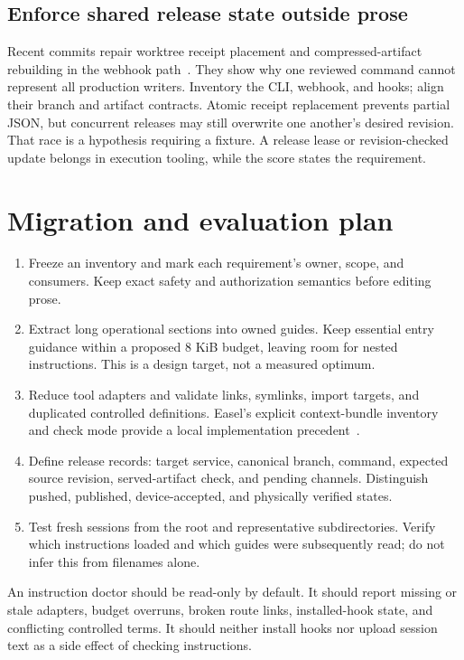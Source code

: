 \documentclass[10pt,letterpaper,twocolumn]{article}
\begin{document}
\subsection{Enforce shared release state outside prose}
Recent commits repair worktree receipt placement and compressed-artifact rebuilding in the webhook path~\cite{releasefixes}. They show why one reviewed command cannot represent all production writers. Inventory the CLI, webhook, and hooks; align their branch and artifact contracts. Atomic receipt replacement prevents partial JSON, but concurrent releases may still overwrite one another's desired revision. That race is a hypothesis requiring a fixture. A release lease or revision-checked update belongs in execution tooling, while the score states the requirement.

\section{Migration and evaluation plan}
\begin{enumerate}
\item Freeze an inventory and mark each requirement's owner, scope, and consumers. Keep exact safety and authorization semantics before editing prose.
\item Extract long operational sections into owned guides. Keep essential entry guidance within a proposed 8 KiB budget, leaving room for nested instructions. This is a design target, not a measured optimum.
\item Reduce tool adapters and validate links, symlinks, import targets, and duplicated controlled definitions. Easel's explicit context-bundle inventory and check mode provide a local implementation precedent~\cite{bundle}.
\item Define release records: target service, canonical branch, command, expected source revision, served-artifact check, and pending channels. Distinguish pushed, published, device-accepted, and physically verified states.
\item Test fresh sessions from the root and representative subdirectories. Verify which instructions loaded and which guides were subsequently read; do not infer this from filenames alone.
\end{enumerate}

An instruction doctor should be read-only by default. It should report missing or stale adapters, budget overruns, broken route links, installed-hook state, and conflicting controlled terms. It should neither install hooks nor upload session text as a side effect of checking instructions.
\end{document}
